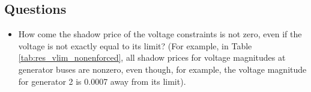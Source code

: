 \documentclass[11pt]{article}
\begin{document}
\subsection{Questions}
\label{sec:questions}

\begin{itemize}
\item How come the shadow price of the voltage constraints is not zero, even if the voltage is not exactly equal to its limit? (For example, in Table \ref{tab:res_vlim_nonenforced}, all shadow prices for voltage magnitudes at generator buses are nonzero, even though, for example, the voltage magnitude for generator 2 is 0.0007 away from its limit). 
\end{itemize}
\end{document}

